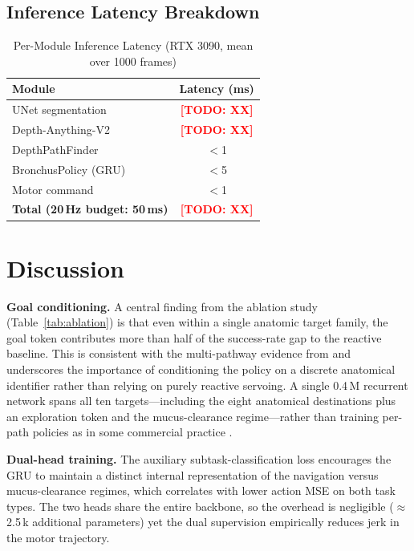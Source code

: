\documentclass[journal,comsoc]{IEEEtran}
\newcommand{\TODO}[1]{\textcolor{red}{\textbf{[TODO: #1]}}}
\begin{document}
\subsection{Inference Latency Breakdown}

\begin{table}[h]
\caption{Per-Module Inference Latency (RTX 3090, mean over 1000 frames)}
\label{tab:latency}
\centering
\small
\begin{tabular}{lc}
\toprule
Module & Latency (ms) \\
\midrule
UNet segmentation     & \TODO{XX} \\
Depth-Anything-V2     & \TODO{XX} \\
DepthPathFinder       & $<$1      \\
BronchusPolicy (GRU)  & $<$5      \\
Motor command         & $<$1      \\
\textbf{Total (20\,Hz budget: 50\,ms)} & \TODO{XX} \\
\bottomrule
\end{tabular}
\end{table}

\section{Discussion}
\label{sec:discussion}

\textbf{Goal conditioning.}
A central finding from the ablation study (Table~\ref{tab:ablation})
is that even within a single anatomic target family, the goal token
contributes more than half of the success-rate gap to the reactive
baseline. This is consistent with the multi-pathway evidence from
\cite{longshort2026} and underscores the importance of conditioning
the policy on a discrete anatomical identifier rather than relying on
purely reactive servoing. A single 0.4\,M recurrent network spans all
ten targets---including the eight anatomical destinations plus an
exploration token and the mucus-clearance regime---rather than training
per-path policies as in some commercial practice \cite{target2025}.

\textbf{Dual-head training.}
The auxiliary subtask-classification loss encourages the GRU to
maintain a distinct internal representation of the navigation versus
mucus-clearance regimes, which correlates with lower action MSE on
both task types. The two heads share the entire backbone, so the
overhead is negligible ($\approx$2.5\,k additional parameters) yet
the dual supervision empirically reduces jerk in the motor trajectory.
\end{document}
